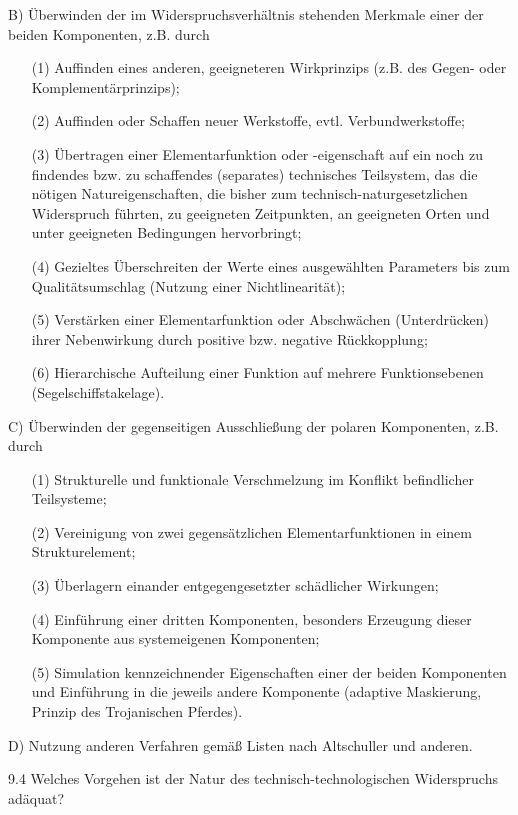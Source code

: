 \documentclass[12pt,a4paper]{article}
\begin{document}
B) Überwinden der im Widerspruchsverhältnis stehenden Merkmale einer der beiden
Komponenten, z.B. durch
\begin{itemize}
\item [(1)] Auffinden eines anderen, geeigneteren Wirkprinzips (z.B. des Gegen- oder Komplementärprinzips);
\item [(2)] Auffinden oder Schaffen neuer Werkstoffe, evtl. Verbundwerkstoffe;
\item [(3)] Übertragen einer Elementarfunktion oder -eigenschaft auf ein noch
  zu findendes bzw. zu schaffendes (separates) technisches Teilsystem, das die
  nötigen Natureigenschaften, die bisher zum technisch-naturgesetzlichen
  Widerspruch führten, zu geeigneten Zeitpunkten, an geeigneten Orten und unter
  geeigneten Bedingungen hervorbringt;
 \item [(4)] Gezieltes Überschreiten der Werte eines ausgewählten Parameters
   bis zum Qualitätsumschlag (Nutzung einer Nichtlinearität);
 \item [(5)] Verstärken einer Elementarfunktion oder Abschwächen (Unterdrücken)
   ihrer Nebenwirkung durch positive bzw. negative Rückkopplung;
 \item [(6)] Hierarchische Aufteilung einer Funktion auf mehrere
   Funktionsebenen (Segelschiffstakelage).
\end{itemize}

C) Überwinden der gegenseitigen Ausschließung der polaren Komponenten,
z.B. durch
\begin{itemize}
\item [(1)] Strukturelle und funktionale Verschmelzung im Konflikt befindlicher
  Teilsysteme;
  \item [(2)] Vereinigung von zwei gegensätzlichen Elementarfunktionen in einem
    Strukturelement;
  \item [(3)] Überlagern einander entgegengesetzter schädlicher Wirkungen;
  \item [(4)] Einführung einer dritten Komponenten, besonders Erzeugung dieser
    Komponente aus systemeigenen Komponenten;
 \item [(5)] Simulation kennzeichnender Eigenschaften einer der beiden
   Komponenten und Einführung in die jeweils andere Komponente (adaptive
   Maskierung, Prinzip des Trojanischen Pferdes).
\end{itemize}

D)   Nutzung anderen Verfahren gemäß Listen nach Altschuller und anderen.

9.4 Welches Vorgehen ist der Natur des technisch-technologischen Widerspruchs
adäquat?
\end{document}
